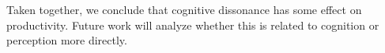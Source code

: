 
Taken together, we conclude that cognitive dissonance has some effect on productivity.
Future work will analyze whether this is related to cognition or perception more directly.
